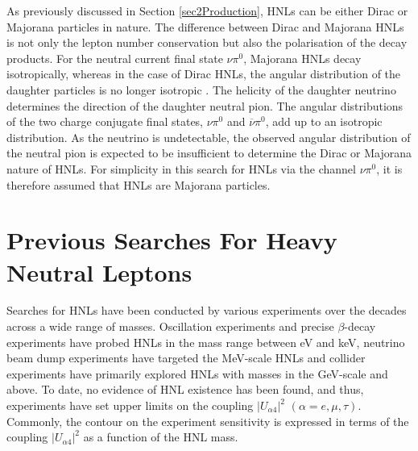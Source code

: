 

As previously discussed in Section \ref{sec2Production}, HNLs can be either Dirac or Majorana particles in nature.
The difference between Dirac and Majorana HNLs is not only the lepton number conservation but also the polarisation of the decay products.
For the neutral current final state $\nu\pi^0$, Majorana HNLs decay isotropically, whereas in the case of Dirac HNLs, the angular distribution of the daughter particles is no longer isotropic \cite{HNLSilvia}.
The helicity of the daughter neutrino determines the direction of the daughter neutral pion.
The angular distributions of the two charge conjugate final states, $\nu\pi^{0}$ and $\overline{\nu}\pi^{0}$, add up to an isotropic distribution.
As the neutrino is undetectable, the observed angular distribution of the neutral pion is expected to be insufficient to determine the Dirac or Majorana nature of HNLs.
For simplicity in this search for HNLs via the channel $\nu\pi^0$, it is therefore assumed that HNLs are Majorana particles.

\section{Previous Searches For Heavy Neutral Leptons}
\label{sec2Previous}


Searches for HNLs have been conducted by various experiments over the decades across a wide range of masses.
Oscillation experiments and precise $\beta$-decay experiments have probed HNLs in the mass range between eV and keV, neutrino beam dump experiments have targeted the MeV-scale HNLs and collider experiments have primarily explored HNLs with masses in the GeV-scale and above.
To date, no evidence of HNL existence has been found, and thus, experiments have set upper limits on the coupling $|U_{\alpha4}|^{2}$ $(\alpha=e,\mu,\tau)$.
Commonly, the contour on the experiment sensitivity is expressed in terms of the coupling $|U_{\alpha4}|^{2}$ as a function of the HNL mass.

